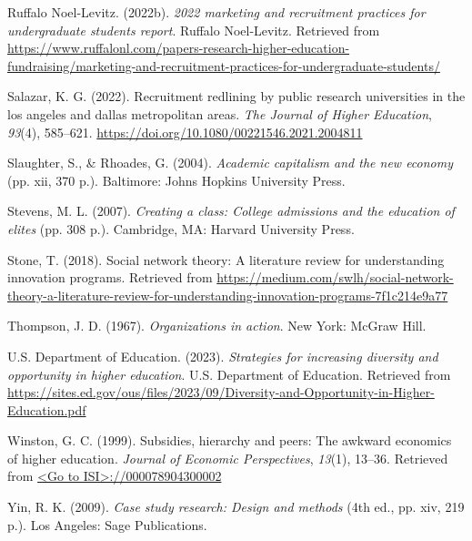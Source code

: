 \documentclass[
  12pt,
]{article}
\newlength{\cslhangindent}
\newlength{\cslentryspacingunit} %
\newenvironment{CSLReferences}[2] %
 {%
  \setlength{\parindent}{0pt}
  \ifodd #1
  \let\oldpar\par
  \def\par{\hangindent=\cslhangindent\oldpar}
  \fi
  \setlength{\parskip}{#2\cslentryspacingunit}
 }%
 {}
\begin{document}
\begin{CSLReferences}{1}{0}
\leavevmode{}%
Ruffalo Noel-Levitz. (2022b). \emph{2022 marketing and recruitment practices for undergraduate students report}. Ruffalo Noel-Levitz. Retrieved from \url{https://www.ruffalonl.com/papers-research-higher-education-fundraising/marketing-and-recruitment-practices-for-undergraduate-students/}

\leavevmode{}%
Salazar, K. G. (2022). Recruitment redlining by public research universities in the los angeles and dallas metropolitan areas. \emph{The Journal of Higher Education}, \emph{93}(4), 585--621. \url{https://doi.org/10.1080/00221546.2021.2004811}

\leavevmode{}%
Slaughter, S., \& Rhoades, G. (2004). \emph{Academic capitalism and the new economy} (pp. xii, 370 p.). Baltimore: Johns Hopkins University Press.

\leavevmode{}%
Stevens, M. L. (2007). \emph{Creating a class: College admissions and the education of elites} (pp. 308 p.). Cambridge, MA: Harvard University Press.

\leavevmode{}%
Stone, T. (2018). Social network theory: A literature review for understanding innovation programs. Retrieved from \url{https://medium.com/swlh/social-network-theory-a-literature-review-for-understanding-innovation-programs-7f1c214e9a77}

\leavevmode{}%
Thompson, J. D. (1967). \emph{Organizations in action}. New York: McGraw Hill.

\leavevmode{}%
U.S. Department of Education. (2023). \emph{Strategies for increasing diversity and opportunity in higher education}. U.S. Department of Education. Retrieved from \url{https://sites.ed.gov/ous/files/2023/09/Diversity-and-Opportunity-in-Higher-Education.pdf}

\leavevmode{}%
Winston, G. C. (1999). Subsidies, hierarchy and peers: The awkward economics of higher education. \emph{Journal of Economic Perspectives}, \emph{13}(1), 13--36. Retrieved from \href{\%3CGo\%20to\%20ISI\%3E://000078904300002}{\textless Go to ISI\textgreater://000078904300002}

\leavevmode{}%
Yin, R. K. (2009). \emph{Case study research: Design and methods} (4th ed., pp. xiv, 219 p.). Los Angeles: Sage Publications.


\end{CSLReferences}
\end{document}
